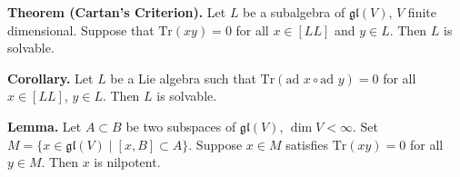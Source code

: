 \textbf{Theorem (Cartan's Criterion).} Let $L$ be a subalgebra of $\mathfrak{gl}(V)$, $V$ finite dimensional. Suppose that $\text{Tr}(xy) = 0$ for all $x \in [LL]$ and $y \in L$. Then $L$ is solvable.

\textbf{Corollary.} Let $L$ be a Lie algebra such that $\text{Tr}(\text{ad } x \circ \text{ad } y) = 0$ for all $x \in [LL]$, $y \in L$. Then $L$ is solvable.

\textbf{Lemma.} Let $A \subset B$ be two subspaces of $\mathfrak{gl}(V)$, $\dim V < \infty$. Set $M = \{x \in \mathfrak{gl}(V) \mid [x, B] \subset A\}$. Suppose $x \in M$ satisfies $\text{Tr}(xy) = 0$ for all $y \in M$. Then $x$ is nilpotent.
